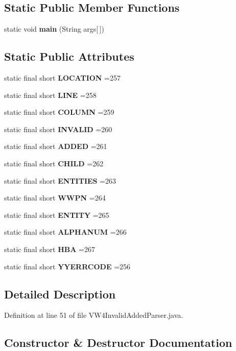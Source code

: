 \subsection*{Static Public Member Functions}
\begin{DoxyCompactItemize}
\item 
static void {\bf main} (String args[$\,$])
\end{DoxyCompactItemize}
\subsection*{Static Public Attributes}
\begin{DoxyCompactItemize}
\item 
static final short {\bf L\+O\+C\+A\+T\+I\+O\+N} =257
\item 
static final short {\bf L\+I\+N\+E} =258
\item 
static final short {\bf C\+O\+L\+U\+M\+N} =259
\item 
static final short {\bf I\+N\+V\+A\+L\+I\+D} =260
\item 
static final short {\bf A\+D\+D\+E\+D} =261
\item 
static final short {\bf C\+H\+I\+L\+D} =262
\item 
static final short {\bf E\+N\+T\+I\+T\+I\+E\+S} =263
\item 
static final short {\bf W\+W\+P\+N} =264
\item 
static final short {\bf E\+N\+T\+I\+T\+Y} =265
\item 
static final short {\bf A\+L\+P\+H\+A\+N\+U\+M} =266
\item 
static final short {\bf H\+B\+A} =267
\item 
static final short {\bf Y\+Y\+E\+R\+R\+C\+O\+D\+E} =256
\end{DoxyCompactItemize}


\subsection{Detailed Description}


Definition at line 51 of file V\+W4\+Invalid\+Added\+Parser.\+java.



\subsection{Constructor \& Destructor Documentation}
